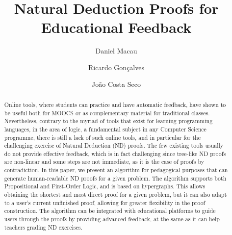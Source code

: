 \documentclass[runningheads]{llncs}
\begin{document}
\title{Natural Deduction Proofs for Educational Feedback}

\author{Daniel Macau
\and Ricardo Gonçalves
\and João Costa Seco}


\maketitle 

\begin{abstract}
Online tools, where students can practice and have automatic feedback, have shown to be useful both for MOOCS or as complementary material for traditional classes. Nevertheless, contrary to the myriad of tools that exist for learning programming languages, in the area of logic, a fundamental subject in any Computer Science programme, there is still a lack of such online tools, and in particular for the challenging exercise of Natural Deduction (ND) proofs. The few existing tools usually do not provide effective feedback, which is in fact challenging since tree-like ND proofs are non-linear and some steps are not immediate, as it is the case of proofs by contradiction. In this paper, we present an algorithm for pedagogical purposes that can generate human-readable ND proofs for a given problem. The algorithm supports both Propositional and First-Order Logic, and is based on hypergraphs. This allows obtaining the shortest and most direct proof for a given problem, but it can also adapt to a user’s current unfinished proof, allowing for greater flexibility in the proof construction. The algorithm can be integrated with educational platforms to guide users through the proofs by providing advanced feedback, at the same as it can help teachers grading ND exercises. 

\end{abstract}










\end{document}
